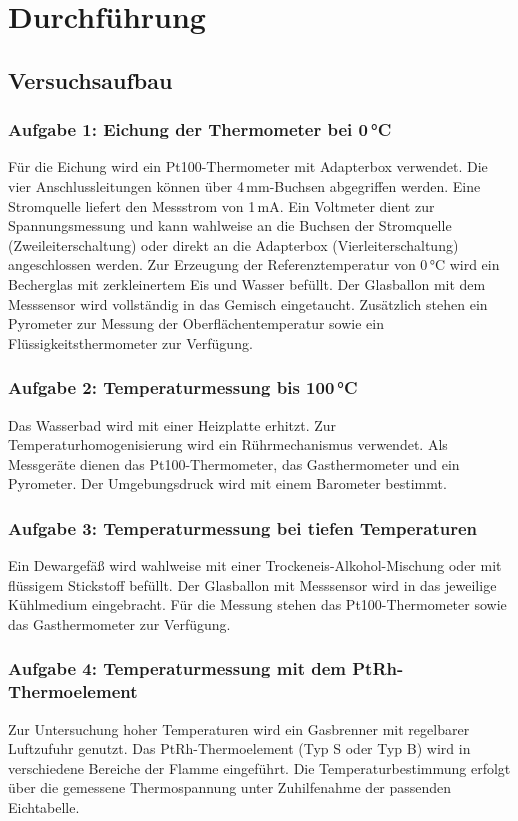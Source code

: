 \chapter{Durchführung}

\section{Versuchsaufbau}

\subsection*{Aufgabe 1: Eichung der Thermometer bei 0\,°C}
Für die Eichung wird ein Pt100-Thermometer mit Adapterbox verwendet. Die vier Anschlussleitungen können über 4\,mm-Buchsen abgegriffen werden. Eine Stromquelle liefert den Messstrom von 1\,mA. Ein Voltmeter dient zur Spannungsmessung und kann wahlweise an die Buchsen der Stromquelle (Zweileiterschaltung) oder direkt an die Adapterbox (Vierleiterschaltung) angeschlossen werden.  
Zur Erzeugung der Referenztemperatur von 0\,°C wird ein Becherglas mit zerkleinertem Eis und Wasser befüllt. Der Glasballon mit dem Messsensor wird vollständig in das Gemisch eingetaucht. Zusätzlich stehen ein Pyrometer zur Messung der Oberflächentemperatur sowie ein Flüssigkeitsthermometer zur Verfügung.

\subsection*{Aufgabe 2: Temperaturmessung bis 100\,°C}
Das Wasserbad wird mit einer Heizplatte erhitzt. Zur Temperaturhomogenisierung wird ein Rührmechanismus verwendet. Als Messgeräte dienen das Pt100-Thermometer, das Gasthermometer und ein Pyrometer. Der Umgebungsdruck wird mit einem Barometer bestimmt.

\subsection*{Aufgabe 3: Temperaturmessung bei tiefen Temperaturen}
Ein Dewargefäß wird wahlweise mit einer Trockeneis-Alkohol-Mischung oder mit flüssigem Stickstoff befüllt. Der Glasballon mit Messsensor wird in das jeweilige Kühlmedium eingebracht. Für die Messung stehen das Pt100-Thermometer sowie das Gasthermometer zur Verfügung.

\subsection*{Aufgabe 4: Temperaturmessung mit dem PtRh-Thermoelement}
Zur Untersuchung hoher Temperaturen wird ein Gasbrenner mit regelbarer Luftzufuhr genutzt. Das PtRh-Thermoelement (Typ S oder Typ B) wird in verschiedene Bereiche der Flamme eingeführt. Die Temperaturbestimmung erfolgt über die gemessene Thermospannung unter Zuhilfenahme der passenden Eichtabelle.

